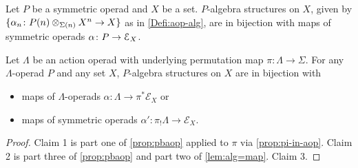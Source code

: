

\begin{lem}\label{lem:alg=map}
 Let $P$ be a symmetric operad and $X$ be a set. $P$-algebra structures on $X$, given by $\{ \alpha_n \colon  P(n) \otimes_{\Sigma(n)} X^{n} \rightarrow X\}$ as in \cref{Defi:aop-alg}, are in bijection with maps of symmetric operads $\alpha \colon P \to \mathcal{E}_X$.
\end{lem}

\begin{cor}\label{cor:pi-star}
Let $\Lambda$ be an action operad with underlying permutation map $\pi \colon \Lambda \to \Sigma$. 
 For any $\Lambda$-operad $P$ and any set $X$, $P$-algebra structures on $X$ are in bijection with 
\begin{itemize}
\item maps of $\Lambda$-operads $\alpha \colon \Lambda \to \pi^* \mathcal{E}_X$ or
\item maps of symmetric operads $\alpha' \colon \pi_{!}\Lambda \to  \mathcal{E}_X$.
\end{itemize}
\end{cor}
\begin{proof}
Claim 1 is part one of \cref{prop:pbaop} applied to $\pi$ via \cref{prop:pi-in-aop}.
Claim 2 is part three of \cref{prop:pbaop} and part two of \cref{lem:alg=map}.
Claim 3.
\end{proof}

\begin{rem}\label{rem:sym-vs-lam}
\end{rem}

